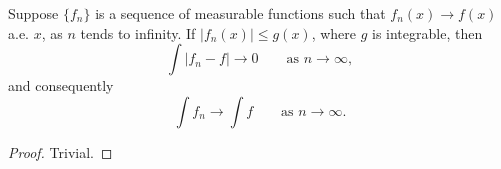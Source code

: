 \begin{theorem}
  Suppose $\{f_n\}$ is a sequence of measurable functions such that
  $f_n(x) \to f(x)$ a.e. $x$, as $n$ tends to infinity.
  If $|f_n(x)| \leq g(x)$, where $g$ is integrable, then
  \begin{equation}
    \int |f_n - f| \to 0 \qquad \text{as } n \to \infty,
  \end{equation}
  and consequently
  \begin{equation}
    \int f_n \to \int f \qquad \text{as } n \to \infty.
  \end{equation}
\end{theorem}

\begin{proof}
  Trivial.
\end{proof}
